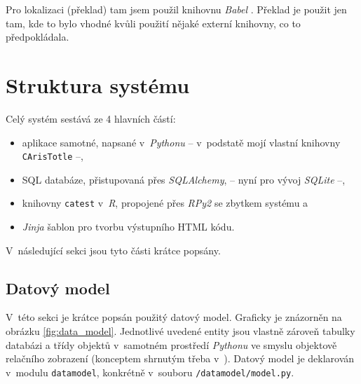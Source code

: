 \documentclass[a4paper,twoside,12pt]{scrbook}
\begin{document}
Pro lokalizaci (překlad) tam jsem použil knihovnu \textit{Babel} \cite{babel}. Překlad je použit jen tam, kde to bylo vhodné kvůli použití nějaké externí knihovny, co to předpokládala.

\section{Struktura systému}
Celý systém sestává ze 4 hlavních částí:
\begin{itemize}
	\item aplikace samotné, napsané v~\textit{Pythonu} -- v~podstatě mojí vlastní knihovny \texttt{CArisTotle} --,
	\item SQL databáze, přistupovaná přes \textit{SQLAlchemy}, -- nyní pro vývoj \textit{SQLite} --,
	\item knihovny \texttt{catest} v~\textit{R}, propojené přes \textit{RPy2} se zbytkem systému a
	\item \textit{Jinja} šablon pro tvorbu výstupního HTML kódu.
\end{itemize}
V~následující sekci jsou tyto části krátce popsány.

\subsection{Datový model}
V~této sekci je krátce popsán použitý datový model. Graficky je znázorněn na obrázku \ref{fig:data_model}. Jednotlivé uvedené entity jsou vlastně zároveň tabulky databázi a třídy objektů v~samotném prostředí \textit{Pythonu} ve smyslu objektově relačního zobrazení (konceptem shrnutým třeba v~\cite{ORM}). Datový model je deklarován v~modulu \texttt{datamodel}, konkrétně v~souboru \texttt{/datamodel/model.py}.
\end{document}
